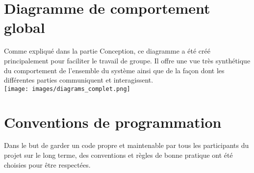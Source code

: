 \documentclass[11pt,a4paper,11pt]{report}
\begin{document}
\newpage




\appendix



%


\chapter{Diagramme de comportement global}
\label{dia_complet}
Comme expliqué dans la partie Conception, ce diagramme a été créé principalement pour faciliter le travail de groupe. Il offre une vue très synthétique du comportement de l'ensemble du système ainsi que de la façon dont les différentes parties communiquent et interagissent.\\
\texttt{[image: images/diagrams\_complet.png]}





\chapter{Conventions de programmation}


Dans le but de garder un code propre et maintenable par tous les participants du projet sur le long terme, des conventions et règles de bonne pratique ont été choisies pour être respectées.\\
\end{document}
